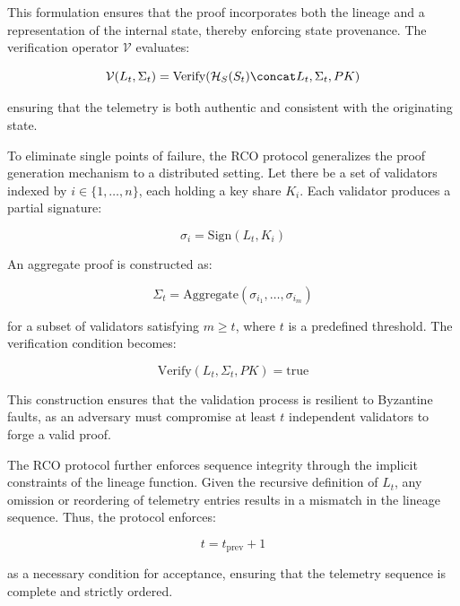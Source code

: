 This formulation ensures that the proof incorporates both the lineage and a representation of the internal state, thereby enforcing state provenance. The verification operator $\mathcal{V}$ evaluates:

\begin{equation}
\mathcal{V}(L_t, \Sigma_t) = \text{Verify}(\mathcal{H}_S(S_t) \concat L_t, \Sigma_t, PK)
\end{equation}

ensuring that the telemetry is both authentic and consistent with the originating state.

To eliminate single points of failure, the RCO protocol generalizes the proof generation mechanism to a distributed setting. Let there be a set of validators indexed by $i \in \{1, \dots, n\}$, each holding a key share $K_i$. Each validator produces a partial signature:

\begin{equation}
\sigma_i = \text{Sign}(L_t, K_i)
\end{equation}

An aggregate proof is constructed as:

\begin{equation}
\Sigma_t = \text{Aggregate}(\sigma_{i_1}, \dots, \sigma_{i_m})
\end{equation}

for a subset of validators satisfying $m \geq t$, where $t$ is a predefined threshold. The verification condition becomes:

\begin{equation}
\text{Verify}(L_t, \Sigma_t, PK) = \text{true}
\end{equation}

This construction ensures that the validation process is resilient to Byzantine faults, as an adversary must compromise at least $t$ independent validators to forge a valid proof.

The RCO protocol further enforces sequence integrity through the implicit constraints of the lineage function. Given the recursive definition of $L_t$, any omission or reordering of telemetry entries results in a mismatch in the lineage sequence. Thus, the protocol enforces:

\begin{equation}
t = t_{\text{prev}} + 1
\end{equation}

as a necessary condition for acceptance, ensuring that the telemetry sequence is complete and strictly ordered.

